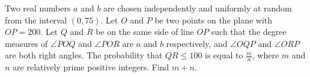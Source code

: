 Two real numbers $a$ and $b$ are chosen independently and uniformly at random from the interval $(0, 75)$. Let $O$ and $P$ be two points on the plane with $OP = 200$. Let $Q$ and $R$ be on the same side of line $OP$ such that the degree measures of $\angle POQ$ and $\angle POR$ are $a$ and $b$ respectively, and $\angle OQP$ and $\angle ORP$ are both right angles. The probability that $QR \leq 100$ is equal to $\frac{m}{n}$,  where $m$ and $n$ are relatively prime positive integers. Find $m + n$.